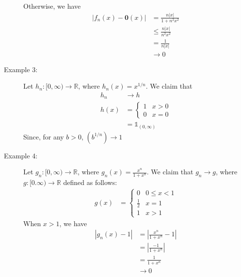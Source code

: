 \documentclass[10pt]{extarticle}
\renewcommand{\mathbf}[1]{\mathbold{#1}}
\newcommand{\R}{\mathbb{R}}
\begin{document}
\begin{description}
        Otherwise, we have
        \begin{align*}
          \left|f_n(x) - \mathbf{0}(x)\right| &= \frac{n|x|}{1 + n^2x^2}\\
                                              &\leq \frac{n|x|}{n^2x^2}\\
                                              &= \frac{1}{n|x|}\\
                                              &\rightarrow 0
        \end{align*}
      \item[Example 3:] Let $h_n: [0,\infty)\rightarrow \R$, where $h_n(x) = x^{1/n}$. We claim that
        \begin{align*}
          h_{n} &\rightarrow h\\
          h(x) &= \begin{cases}
            1 & x > 0\\
            0 & x = 0
          \end{cases}\\
               &= \mathbb{1}_{(0,\infty)}
        \end{align*}
        Since, for any $b > 0$, $\left(b^{1/n}\right)\rightarrow 1$
      \item[Example 4:] Let $g_n: [0,\infty) \rightarrow \R$, where $g_n(x) = \frac{x^n}{1 + x^n}$. We claim that $g_n \rightarrow g$, where $g: [0.\infty) \rightarrow \R$ defined as follows:
        \begin{align*}
          g(x) &= \begin{cases}
            0 & 0 \leq x < 1\\
            \frac{1}{2} & x = 1\\
            1 & x > 1
          \end{cases}
        \end{align*}
        When $x > 1$, we have
        \begin{align*}
          \left|g_n(x) - 1\right| &= \left|\frac{x^n}{1 + x^n} - 1\right|\\
                                  &= \left|\frac{-1}{1 + x^n}\right|\\
                                  &= \frac{1}{1+x^n}\\
                                  &\rightarrow 0
        \end{align*}
    \end{description}
\end{document}
